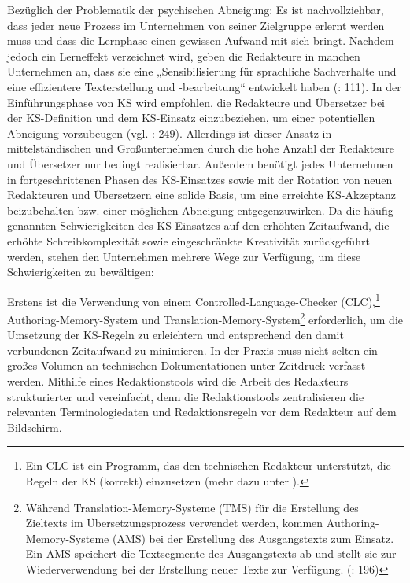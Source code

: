 Bezüglich der Problematik der psychischen Abneigung: Es ist nachvollziehbar, dass jeder neue Prozess im Unternehmen von seiner Zielgruppe erlernt werden muss und dass die Lernphase einen gewissen Aufwand mit sich bringt. Nachdem jedoch ein Lerneffekt verzeichnet wird, geben die Redakteure in manchen Unternehmen an, dass sie eine „Sensibilisierung für sprachliche Sachverhalte und eine effizientere Texterstellung und -bearbeitung“ entwickelt haben (\citealt{LehrndorferReuther2008}: 111). In der Einführungsphase von KS wird empfohlen, die Redakteure und Übersetzer bei der KS-Definition und dem KS-Einsatz einzubeziehen, um einer potentiellen Abneigung vorzubeugen (vgl. \citealt{NybergEtAl2003}: 249). Allerdings ist dieser Ansatz in mittelständischen und Großunternehmen durch die hohe Anzahl der Redakteure und Übersetzer nur bedingt realisierbar. Außerdem benötigt jedes Unternehmen in fortgeschrittenen Phasen des KS-Einsatzes sowie mit der Rotation von neuen Redakteuren und Übersetzern eine solide Basis, um eine erreichte KS-Akzeptanz beizubehalten bzw. einer möglichen Abneigung entgegenzuwirken. Da die häufig genannten Schwierigkeiten des KS-Einsatzes auf den erhöhten Zeitaufwand, die erhöhte Schreibkomplexität sowie eingeschränkte Kreativität zurückgeführt werden, stehen den Unternehmen mehrere Wege zur Verfügung, um diese Schwierigkeiten zu bewältigen:

Erstens ist die Verwendung von einem Controlled-Language-Checker (CLC),\footnote{{{{Ein CLC ist ein Programm, das den technischen Redakteur unterstützt, die Regeln der KS (korrekt) einzusetzen (mehr dazu unter ).} }}} Authoring-Memory-System und Translation-Memory-System\footnote{{{{Während Translation-Memory-Systeme (TMS) für die Erstellung des Zieltexts im Übersetzungsprozess verwendet werden, kommen Authoring-Memory-Systeme (AMS) bei der Erstellung des Ausgangstexts zum Einsatz. Ein AMS speichert die Textsegmente des Ausgangstexts ab und stellt sie zur Wiederverwendung bei der Erstellung neuer Texte zur Verfügung. (\citealt{DrewerSchmitz2017}: 196)}}} } erforderlich, um die Umsetzung der KS-Regeln zu erleichtern und entsprechend den damit verbundenen Zeitaufwand zu minimieren. In der Praxis muss nicht selten ein großes Volumen an technischen Dokumentationen unter Zeitdruck verfasst werden. Mithilfe eines Redaktionstools wird die Arbeit des Redakteurs strukturierter und vereinfacht, denn die Redaktionstools zentralisieren die relevanten Terminologiedaten und Redaktionsregeln vor dem Redakteur auf dem Bildschirm.

